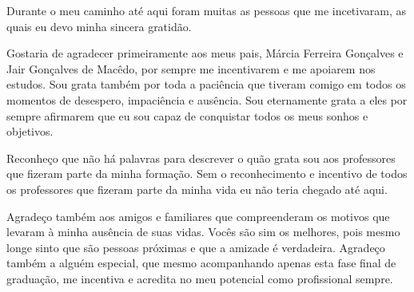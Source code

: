 \begin{agradecimentos}
Durante o meu caminho até aqui foram muitas as pessoas que me incetivaram, as quais eu devo minha sincera gratidão. 

Gostaria de agradecer primeiramente aos meus pais, Márcia Ferreira Gonçalves e Jair Gonçalves de Macêdo, por sempre me incentivarem e me apoiarem nos estudos. Sou grata também por toda a paciência que tiveram comigo em todos os momentos de desespero, impaciência e ausência. Sou eternamente grata a eles por sempre afirmarem que eu sou capaz de conquistar todos os meus sonhos e objetivos.

Reconheço que não há palavras para descrever o quão grata sou aos professores que fizeram parte da minha formação. Sem o reconhecimento e incentivo de todos os professores que fizeram parte da minha vida eu não teria chegado até aqui.

Agradeço também aos amigos e familiares que compreenderam os motivos que levaram à minha ausência de suas vidas. Vocês são sim os melhores, pois mesmo longe sinto que são pessoas próximas e que a amizade é verdadeira. Agradeço também a alguém especial, que mesmo acompanhando apenas esta fase final de graduação, me incentiva e acredita no meu potencial como profissional sempre.

\end{agradecimentos}
